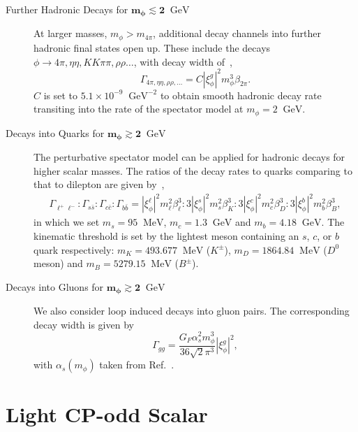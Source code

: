 \documentclass[letterpaper,11pt]{article}
\newcommand{\be}{\begin{equation}\begin{aligned}}
\newcommand{\ee}{\end{aligned}\end{equation}}
\newcommand{\mev}{\text{~MeV}}
\newcommand{\gev}{\text{~GeV}}
\def\gev{\textrm{~GeV}}
\begin{document}
\begin{description}
\item[Further Hadronic Decays for $\mathbf{m_\phi\lesssim 2}~\gev$]
%
At larger masses, $m_\phi>m_{4\pi}$, additional decay channels into further hadronic final states open up. These include the decays $\phi \to 4\pi, \eta\eta, KK \pi\pi, \rho\rho \ldots$, with decay width of~\cite{Winkler:2018qyg, Grinstein:1988yu},
\begin{equation}
    \Gamma_{4 \pi, \eta \eta, \rho \rho, \ldots}=C |\xi_\phi^{g}|^2 m_{\phi}^{3} \beta_{2\pi}.
\end{equation}
$C$ is set to $5.1\times 10^{-9}~\gev^{-2}$ to 
obtain smooth hadronic decay rate transiting into the rate of the spectator model at $m_\phi=2~\gev$.  

\item[Decays into Quarks for $\mathbf{m_\phi\gtrsim 2}~\gev$]
%
The perturbative spectator model can be applied for hadronic decays for higher scalar masses.  The ratios of the decay rates to quarks comparing to that to dilepton are given by~\cite{Winkler:2018qyg}, 
%
\be
    \Gamma_{\ell^+\ell^-}:\Gamma_{s\bar{s}}:\Gamma_{c\bar{c}}:\Gamma_{b\bar{b}}=
    |\xi_\phi^{\ell}|^2  m_\ell^2\beta_\ell^3:3|\xi_\phi^s|^2 m_s^2\beta_K^3:3 |\xi_\phi^c|^2 m_c^2\beta_D^3:3 |\xi_\phi^b|^2 m_b^2\beta_B^3,
\ee
%
in which we set $m_s=95~\mev$, $m_c=1.3~\gev$ and $m_b=4.18~\gev$. The kinematic threshold is set by the lightest meson containing an $s$, $c$, or $b$ quark respectively: $m_K=493.677~\mev$ ($K^\pm$), $m_D=1864.84~\mev$ ($D^0$ meson) and $m_B=5279.15~\mev$ ($B^\pm$).

\item[Decays into Gluons for $\mathbf{m_\phi\gtrsim 2}~\gev$]

We also consider loop induced decays into gluon pairs. The corresponding decay width is given by
\begin{equation}
    \Gamma_{gg}
    =\frac{G_F \alpha_s^2  m_\phi^3 }{36\sqrt{2}\pi^3}|\xi_{\phi}^{g}|^2,
\label{eq:hgg}
\end{equation}
% 
with $\alpha_s(m_\phi)$  taken from Ref.~\cite{Bethke:2006ac}.
 


\end{description}
% 




\section{Light CP-odd Scalar}
\label{sec:oddscalar}
\end{document}
